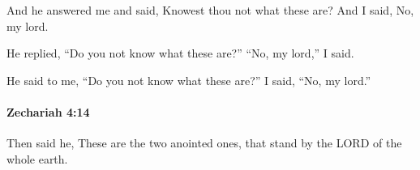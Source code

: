 			\begin{versebox}
					\item[BHS] 
					\item[LXX] 
					\item[ASV] And he answered me and said, Knowest thou not what these are? And I said, No, my lord.
					\item[NIV] He replied, “Do you not know what these are?” “No, my lord,” I said.
					\item[NRSV] He said to me, “Do you not know what these are?” I said, “No, my lord.”
			\end{versebox}

		\paragraph{Zechariah 4:14} %
			\label{ZECHARIAH-4-14}

			Then said he, These are the two anointed ones, that stand by the LORD of the whole earth.

